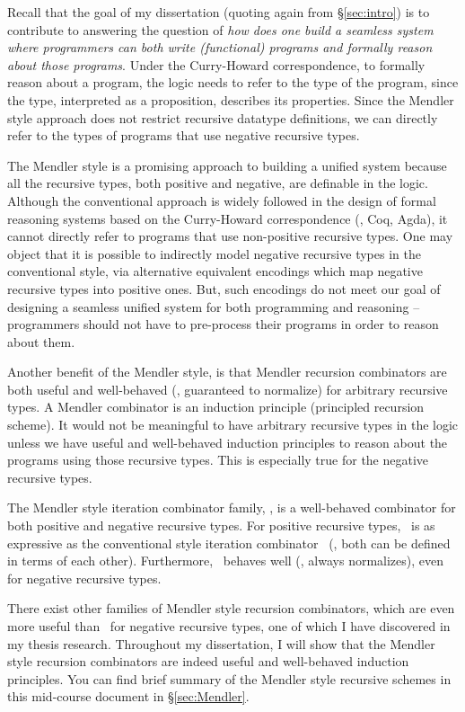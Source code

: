 Recall that the goal of my dissertation (quoting again from \S\ref{sec:intro})
is to contribute to answering the question of {\em how does one build a
seamless system where programmers can both write (functional) programs and
formally reason about those programs}. Under the Curry-Howard correspondence,
to formally reason about a program, the logic needs to refer to the type of
the program, since the type, interpreted as a proposition, describes its
properties. Since the Mendler style approach does not restrict recursive
datatype definitions, we can directly refer to the types of programs that use
negative recursive types.

The Mendler style is a promising approach to building a unified system because
all the recursive types, both positive and negative, are definable in the
logic. Although the conventional approach is widely followed in the design of
formal reasoning systems based on the Curry-Howard correspondence (\eg, Coq,
Agda), it cannot directly refer to programs that use non-positive recursive
types. One may object that it is possible to indirectly model negative
recursive types in the conventional style, via alternative equivalent
encodings which map negative recursive types into positive ones. But, such
encodings do not meet our goal of designing a seamless unified system for both
programming and reasoning -- programmers should not have to pre-process their
programs in order to reason about them.

Another benefit of the Mendler style, is that Mendler recursion combinators
are both useful and well-behaved (\ie, guaranteed to normalize) for arbitrary
recursive types. A Mendler combinator is an induction principle
(principled recursion scheme). It would not be meaningful to have
arbitrary recursive types in the logic unless we have useful and well-behaved
induction principles to reason about the programs using those recursive types.
This is especially true for the negative recursive types.

The Mendler style iteration combinator family, \MIt, is a well-behaved
combinator for both positive and negative recursive types.
For positive recursive types, \MIt\ is as expressive as the conventional style
iteration combinator \It\ (\ie, both can be defined in terms of each other). 
Furthermore, \MIt\ behaves well (\ie, always normalizes), even for negative
recursive types.

There exist other families of Mendler style recursion combinators,
which are even more useful than \MIt\ for negative recursive types,
one of which I have discovered in my thesis research. Throughout
my dissertation, I will show that the Mendler style recursion combinators are
indeed useful and well-behaved induction principles. You can find brief
summary of the Mendler style recursive schemes in this mid-course document
in \S\ref{sec:Mendler}.


